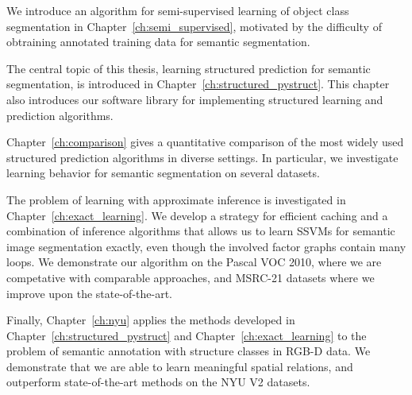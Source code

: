 We introduce an algorithm for semi-supervised learning of object class
segmentation in Chapter~\ref{ch:semi_supervised}, motivated by the difficulty of
obtraining annotated training data for semantic segmentation.

The central topic of this thesis, learning structured prediction for semantic
segmentation, is introduced in Chapter~\ref{ch:structured_pystruct}. This
chapter also introduces our software library for implementing structured
learning and prediction algorithms.

Chapter~\ref{ch:comparison} gives a quantitative comparison of the most widely
used structured prediction algorithms in diverse settings.
In particular, we investigate learning behavior for
semantic segmentation on several datasets.

The problem of learning with approximate inference is investigated in
Chapter~\ref{ch:exact_learning}.  We develop a strategy for efficient caching
and a combination of inference algorithms that allows us to learn SSVMs for
semantic image segmentation exactly, even though the involved factor graphs
contain many loops. We demonstrate our algorithm on the Pascal VOC 2010, where we are competative
with comparable approaches, and MSRC-21 datasets where we improve upon the state-of-the-art.

Finally, Chapter~\ref{ch:nyu} applies the methods developed in
Chapter~\ref{ch:structured_pystruct} and Chapter~\ref{ch:exact_learning} to the
problem of semantic annotation with structure classes in RGB-D data. We
demonstrate that we are able to learn meaningful spatial relations, and outperform
state-of-the-art methods on the NYU V2 datasets.

